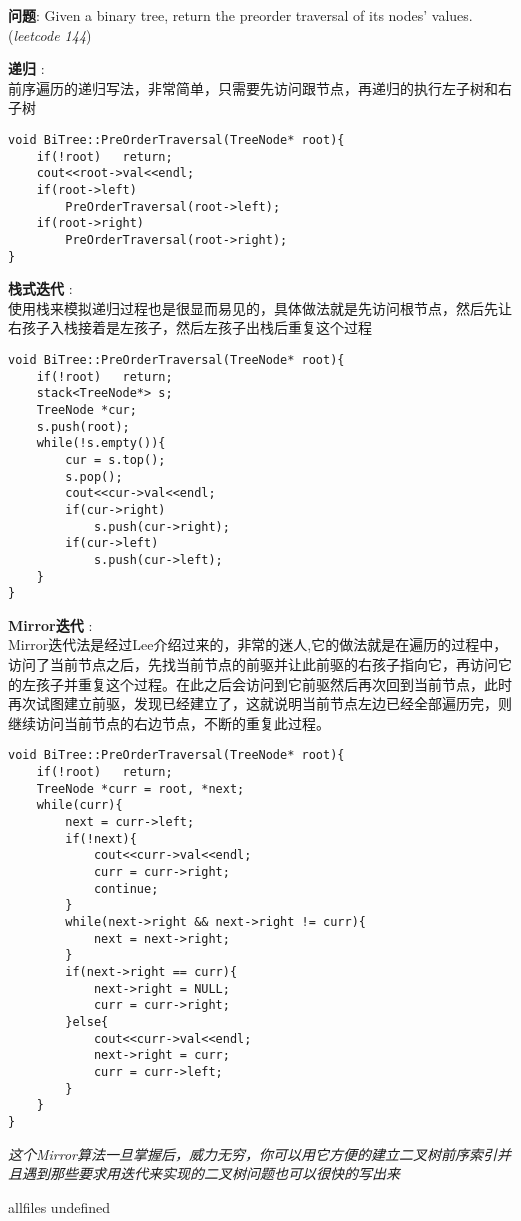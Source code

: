 \documentclass{article}
\begin{document}
\begin{CJK}{UTF8}{gbsn}     %

\else
	
\begin{description}
	\item{\textbf{问题}}: Given a binary tree, return the preorder traversal of its nodes' values.(\textit{leetcode 144})
	\item{\textbf{递归}} : 
	\\前序遍历的递归写法，非常简单，只需要先访问跟节点，再递归的执行左子树和右子树
	\begin{lstlisting}
void BiTree::PreOrderTraversal(TreeNode* root){
	if(!root)	return;
	cout<<root->val<<endl;
	if(root->left)
		PreOrderTraversal(root->left);
	if(root->right)
		PreOrderTraversal(root->right);
}
	\end{lstlisting}
	\item{\textbf{栈式迭代}} : 
	\\使用栈来模拟递归过程也是很显而易见的，具体做法就是先访问根节点，然后先让右孩子入栈接着是左孩子，然后左孩子出栈后重复这个过程
	\begin{lstlisting}
void BiTree::PreOrderTraversal(TreeNode* root){
	if(!root)	return;
	stack<TreeNode*> s;
	TreeNode *cur;
	s.push(root);
	while(!s.empty()){
		cur = s.top();
		s.pop();
		cout<<cur->val<<endl;
		if(cur->right)
			s.push(cur->right);
		if(cur->left)
			s.push(cur->left);
	}
}
	\end{lstlisting}
	\item{\textbf{Mirror迭代}} : 
	\\Mirror迭代法是经过Lee介绍过来的，非常的迷人,它的做法就是在遍历的过程中，访问了当前节点之后，先找当前节点的前驱并让此前驱的右孩子指向它，再访问它的左孩子并重复这个过程。在此之后会访问到它前驱然后再次回到当前节点，此时再次试图建立前驱，发现已经建立了，这就说明当前节点左边已经全部遍历完，则继续访问当前节点的右边节点，不断的重复此过程。
	\begin{lstlisting}
void BiTree::PreOrderTraversal(TreeNode* root){
	if(!root)	return;
	TreeNode *curr = root, *next;
	while(curr){
		next = curr->left;
		if(!next){
			cout<<curr->val<<endl;
			curr = curr->right;
			continue;
		}
		while(next->right && next->right != curr){
			next = next->right;
		}
		if(next->right == curr){
			next->right = NULL;
			curr = curr->right;
		}else{
			cout<<curr->val<<endl;
			next->right = curr;
			curr = curr->left;
		}
	}
}
	\end{lstlisting}
	\textit{这个Mirror算法一旦掌握后，威力无穷，你可以用它方便的建立二叉树前序索引并且遇到那些要求用迭代来实现的二叉树问题也可以很快的写出来}
\end{description}

\fi

\ifx allfiles undefined
\end{CJK}
\end{document}
